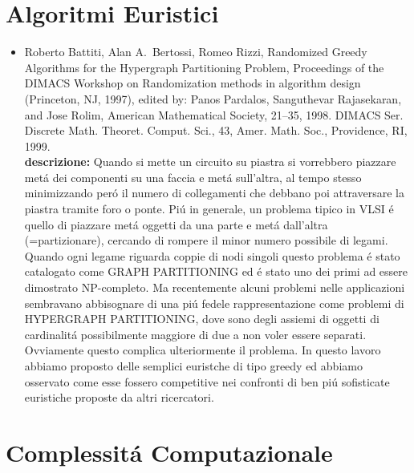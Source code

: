 \documentclass[10pt]{article}
\begin{document}
\section{Algoritmi Euristici}

\begin{itemize}
  \vspace{1.4mm}
  \item[] {\sc Roberto Battiti, Alan A.~Bertossi, Romeo Rizzi},  
   \newblock  Randomized Greedy Algorithms 
              for the Hypergraph Partitioning Problem,
   \newblock Proceedings of the DIMACS Workshop on
             Randomization methods in
             algorithm design (Princeton, NJ, 1997),
             edited by: Panos Pardalos, Sanguthevar Rajasekaran, 
                        and Jose Rolim, 
             American Mathematical Society,  21--35, 1998.
   \newblock DIMACS Ser. Discrete Math. Theoret. Comput. Sci., 43,
             Amer. Math. Soc., Providence, RI, 1999.\\
{\bf descrizione:}
Quando si mette un circuito su piastra
si vorrebbero piazzare met\'a dei componenti su
una faccia e met\'a sull'altra,
al tempo stesso minimizzando per\'o il numero
di collegamenti che debbano poi attraversare la piastra
tramite foro o ponte.
Pi\'u in generale, un problema tipico in VLSI
\'e quello di piazzare met\'a oggetti da una parte
e met\'a dall'altra (=partizionare),
cercando di rompere il minor numero possibile di legami.
Quando ogni legame riguarda coppie di nodi singoli
questo problema \'e stato catalogato come
GRAPH PARTITIONING ed \'e stato uno dei primi
ad essere dimostrato NP-completo.
Ma recentemente alcuni problemi nelle applicazioni
sembravano abbisognare di una pi\'u fedele rappresentazione
come problemi di HYPERGRAPH PARTITIONING,
dove sono degli assiemi di oggetti di cardinalit\'a
possibilmente maggiore di due
a non voler essere separati.
Ovviamente questo complica ulteriormente il problema.
In questo lavoro abbiamo proposto delle semplici euristche
di tipo greedy ed abbiamo osservato
come esse fossero competitive nei confronti di
ben pi\'u sofisticate euristiche proposte
da altri ricercatori.\\
\end{itemize}



\section{Complessit\'a Computazionale}
\end{document}
